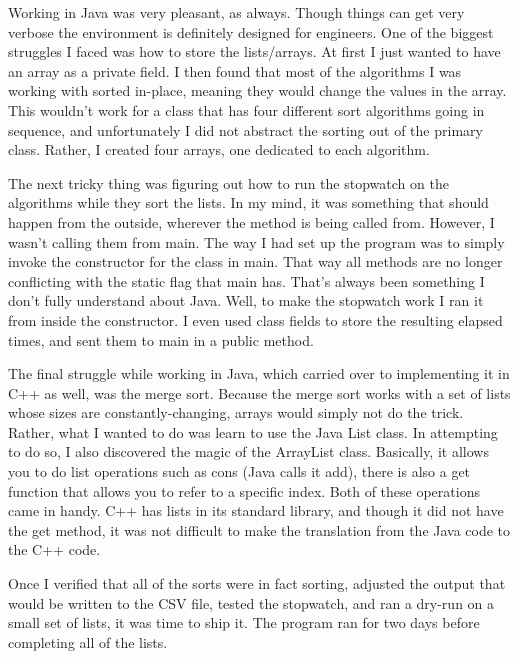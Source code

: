 \documentclass[12pt]{amsart}
\begin{document}
Working in Java was very pleasant, as always. Though things can get very verbose
the environment is definitely designed for engineers. One of the biggest
struggles I faced was how to store the lists/arrays. At first I just wanted to
have an array as a private field. I then found that most of the algorithms I was
working with sorted in-place, meaning they would change the values in the array.
This wouldn't work for a class that has four different sort algorithms going in
sequence, and unfortunately I did not abstract the sorting out of the primary
class. Rather, I created four arrays, one dedicated to each algorithm.

The next tricky thing was figuring out how to run the stopwatch on the 
algorithms while they sort the lists. In my mind, it was something that should 
happen from the outside, wherever the method is being called from. However, I
wasn't calling them from main. The way I had set up the program was to simply
invoke the constructor for the class in main. That way all methods are no longer
conflicting with the static flag that main has. That's always been something I
don't fully understand about Java. Well, to make the stopwatch work I ran it
from inside the constructor. I even used class fields to store the resulting
elapsed times, and sent them to main in a public method.

The final struggle while working in Java, which carried over to implementing it
in C++ as well, was the merge sort. Because the merge sort works with a set of
lists whose sizes are constantly-changing, arrays would simply not do the trick.
Rather, what I wanted to do was learn to use the Java List class. In attempting
to do so, I also discovered the magic of the ArrayList class. Basically, it
allows you to do list operations such as cons (Java calls it add), there is also
a get function that allows you to refer to a specific index. Both of these
operations came in handy. C++ has lists in its standard library, and though it
did not have the get method, it was not difficult to make the translation from
the Java code to the C++ code.

Once I verified that all of the sorts were in fact sorting, adjusted the output
that would be written to the CSV file, tested the stopwatch, and ran a dry-run
on a small set of lists, it was time to ship it. The program ran for two days
before completing all of the lists. 
\end{document}
